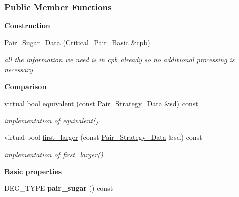 \subsubsection*{Public Member Functions}
\begin{Indent}\textbf{ Construction}\par
\begin{DoxyCompactItemize}
\item 
\mbox{\label{group__strategygroup_a2f244064c356cd5c33164adf75177fac}} 
\hyperlink{group__strategygroup_a2f244064c356cd5c33164adf75177fac}{Pair\+\_\+\+Sugar\+\_\+\+Data} (\hyperlink{group___g_b_computation_class_critical___pair___basic}{Critical\+\_\+\+Pair\+\_\+\+Basic} \&cpb)
\begin{DoxyCompactList}\small\item\em all the information we need is in {\ttfamily cpb} already so no additional processing is necessary \end{DoxyCompactList}\end{DoxyCompactItemize}
\end{Indent}
\begin{Indent}\textbf{ Comparison}\par
\begin{DoxyCompactItemize}
\item 
\mbox{\label{group__strategygroup_abd2ef27e308ee646a64b448ad63e941b}} 
virtual bool \hyperlink{group__strategygroup_abd2ef27e308ee646a64b448ad63e941b}{equivalent} (const \hyperlink{group__strategygroup_class_pair___strategy___data}{Pair\+\_\+\+Strategy\+\_\+\+Data} \&sd) const
\begin{DoxyCompactList}\small\item\em implementation of \hyperlink{group__strategygroup_abd2ef27e308ee646a64b448ad63e941b}{equivalent()} \end{DoxyCompactList}\item 
\mbox{\label{group__strategygroup_aa898723612943072f6b83eaaa58b70ce}} 
virtual bool \hyperlink{group__strategygroup_aa898723612943072f6b83eaaa58b70ce}{first\+\_\+larger} (const \hyperlink{group__strategygroup_class_pair___strategy___data}{Pair\+\_\+\+Strategy\+\_\+\+Data} \&sd) const
\begin{DoxyCompactList}\small\item\em implementation of \hyperlink{group__strategygroup_aa898723612943072f6b83eaaa58b70ce}{first\+\_\+larger()} \end{DoxyCompactList}\end{DoxyCompactItemize}
\end{Indent}
\begin{Indent}\textbf{ Basic properties}\par
\begin{DoxyCompactItemize}
\item 
\mbox{\label{group__strategygroup_af2fddc7e7baf0b270ce9789e4dee5290}} 
D\+E\+G\+\_\+\+T\+Y\+PE {\bfseries pair\+\_\+sugar} () const
\end{DoxyCompactItemize}
\end{Indent}
